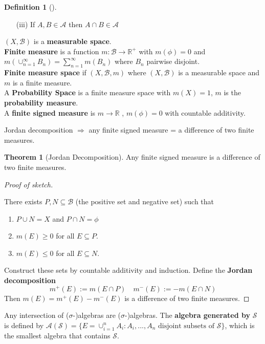 \documentclass{article}
\theoremstyle{definition}
\newtheorem{thm}{Theorem}
\newtheorem{dfn}{Definition}
\newenvironment{proofs}[1][\proofname]{%
  \begin{proof}[#1]$ $\par\nobreak\ignorespaces
}{%
  \end{proof}
}
\newenvironment{dfns}[1][]{%
  \begin{dfn}[#1]$ $\par\nobreak\ignorespaces
}{%
  \end{dfn}
}
\newcommand{\RR}{\mathbb R}
\newcommand{\Ra}{\Rightarrow}
\begin{document}
\begin{dfns}
\begin{enumerate}
\begin{enumerate}
				\item[(iii)] If $A, B \in \mathscr{A}$ then $A \cap B \in \mathscr{A}$
			\end{enumerate}
			$(X, \mathscr{B})$ is a \textbf{measurable space}.\\
			\textbf{Finite measure} is a function $m: \mathscr{B} \to \RR^+$ with $m(\phi) = 0$ and $m(\cup_{n = 1}^\infty B_n ) = \sum_{n = 1}^\infty m(B_n)$ where $B_n$ pairwise disjoint.\\
			\textbf{Finite measure space} if $(X, \mathscr{B}, m)$ where $(X, \mathscr{B})$ is a measurable space and $m$ is a finite measure.\\
			A \textbf{Probability Space} is a finite measure space with $m(X) = 1$, $m$ is the \textbf{probability measure}.\\ 
			A \textbf{finite signed measure} is $m \to \RR$ , $m(\phi) = 0$ with countable additivity.
	\end{enumerate}
\end{dfns}

Jordan decomposition $\Ra$ any finite signed measure = a difference of two finite measures.
\begin{thm}[Jordan Decomposition]
	Any finite signed measure is a difference of two finite measures.
\end{thm}

\begin{proofs}[Proof of sketch]
	There exists $P, N \subseteq \mathscr{B}$ (the positive set and negative set) such that 
	\begin{enumerate}
		\item $P \cup N = X$ and $P \cap N = \phi$

		\item $m(E) \geq 0$ for all $E \subseteq P$.

		\item $m(E) \leq 0$ for all $E \subseteq N$.
	\end{enumerate}
	Construct these sets by countable additivity and induction.
	Define the \textbf{Jordan decomposition}
	\[
		m^+(E) := m(E \cap P) \quad m^-(E) := -m(E \cap N)
	\]
	Then $m(E) = m^+(E) - m^-(E)$ is a difference of two finite measures.
\end{proofs}

Any intersection of ($\sigma$-)algebras are ($\sigma$-)algebras.  
The \textbf{algebra generated by} $\mathscr{S}$ is defined by $\mathscr{A}(\mathscr{S}) = \{E = \cup_{i = 1}^n A_i: A_i ,..., A_n \text{ disjoint subsets of } \mathscr{S}\}$, which is the smallest algebra that contains $\mathscr{S}$. 
\end{document}
